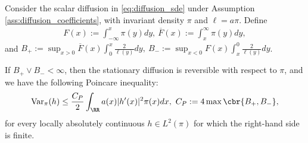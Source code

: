 \documentclass[11pt]{article}
\begin{document}
\begin{lemma}
\label{lem:tool_loukianov_poincare}
Consider the scalar diffusion in \eqref{eq:diffusion_sde} under
Assumption \ref{ass:diffusion_coefficients}, with invariant density $\pi$
and $\ell=a\pi$. Define
\begin{align*}
F(x):=
\int_{-\infty}^x\pi(y)dy,\ 
\overline F(x):=
\int_x^\infty\pi(y)dy,
\end{align*}
and
$B_+:=
\sup_{x>0}
\overline F(x)
\int_0^x\frac{2}{\ell(y)}dy,\ 
B_-:=
\sup_{x<0}
F(x)
\int_x^0\frac{2}{\ell(y)}dy$.

If $B_+\vee B_-<\infty$, then the stationary diffusion is reversible
with respect to $\pi$, and we have the following Poincare inequality:
\begin{align}
\operatorname{Var}_\pi(h)
\le
\frac{C_P}{2}
\int_{\RR}a(x)|h'(x)|^2\pi(x)dx,
\ 
C_P:=4\max\cbr{B_+,B_-},
\label{eq:tool_loukianov_poincare}
\end{align}
for every locally absolutely continuous $h\in L^2(\pi)$ for which the
right-hand side is finite.
\end{lemma}
\end{document}
